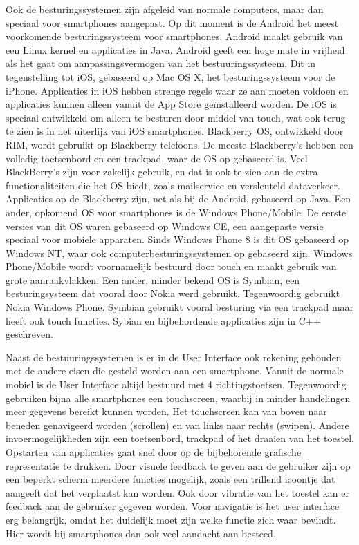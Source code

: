 Ook de besturingssystemen zijn afgeleid van normale computers, maar dan speciaal voor smartphones aangepast.
Op dit moment is de Android het meest voorkomende besturingssysteem voor smartphones.
Android maakt gebruik van een Linux kernel en applicaties in Java.
Android geeft een hoge mate in vrijheid als het gaat om aanpassingsvermogen van het bestuuringssysteem.
Dit in tegenstelling tot iOS, gebaseerd op Mac OS X, het besturingssysteem voor de iPhone.
Applicaties in iOS hebben strenge regels waar ze aan moeten voldoen en applicaties kunnen alleen vanuit de App Store ge\"installeerd worden.
De iOS is speciaal ontwikkeld om alleen te besturen door middel van touch, wat ook terug te zien is in het uiterlijk van iOS smartphones.
Blackberry OS, ontwikkeld door RIM, wordt gebruikt op Blackberry telefoons.
De meeste Blackberry's hebben een volledig toetsenbord en een trackpad, waar de OS op gebaseerd is.
Veel BlackBerry's zijn voor zakelijk gebruik, en dat is ook te zien aan de extra functionaliteiten die het OS biedt, zoals mailservice en versleuteld dataverkeer.
Applicaties op de Blackberry zijn, net als bij de Android, gebaseerd op Java.
Een ander, opkomend OS voor smartphones is de Windows Phone/Mobile.
De eerste versies van dit OS waren gebaseerd op Windows CE, een aangepaste versie speciaal voor mobiele apparaten.
Sinds Windows Phone 8 is dit OS gebaseerd op Windows NT, waar ook computerbesturingssystemen op gebaseerd zijn.
Windows Phone/Mobile wordt voornamelijk bestuurd door touch en maakt gebruik van grote aanraakvlakken.
Een ander, minder bekend OS is Symbian, een besturingsysteem dat vooral door Nokia werd gebruikt.
Tegenwoordig gebruikt Nokia Windows Phone.
Symbian gebruikt vooral besturing via een trackpad maar heeft ook touch functies.
Sybian en bijbehordende applicaties zijn in C++ geschreven.

Naast de bestuuringssystemen is er in de User Interface ook rekening gehouden met de andere eisen die gesteld worden aan een smartphone.
Vanuit de normale mobiel is de User Interface altijd bestuurd met 4 richtingstoetsen.
Tegenwoordig gebruiken bijna alle smartphones een touch\-screen, waarbij in minder handelingen meer gegevens bereikt kunnen worden.
Het touch\-screen kan van boven naar beneden genavigeerd worden (scrollen) en van links naar rechts (swipen).
Andere invoermogelijkheden zijn een toetsenbord, trackpad of het draaien van het toestel.
Opstarten van applicaties gaat snel door op de bijbehorende grafische representatie te drukken.
Door visuele feedback te geven aan de gebruiker zijn op een beperkt scherm meerdere functies mogelijk, zoals een trillend icoontje dat aangeeft dat het verplaatst kan worden.
Ook door vibratie van het toestel kan er feedback aan de gebruiker gegeven worden.
Voor navigatie is het user interface erg belangrijk, omdat het duidelijk moet zijn welke functie zich waar bevindt.
Hier wordt bij smartphones dan ook veel aandacht aan besteed.


